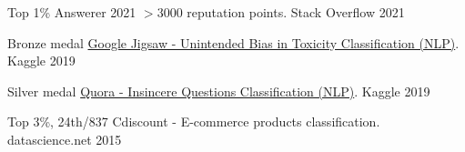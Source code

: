 
\begin{cvhonors}
  \cvhonor
    {Top 1\% Answerer 2021} %
    {$>3000$ reputation points.} %
    {Stack Overflow} %
    {2021} %

  \cvhonor
    {Bronze medal} %
    {\href{https://www.kaggle.com/competitions/jigsaw-unintended-bias-in-toxicity-classification}{Google Jigsaw - Unintended Bias in Toxicity Classification (NLP)}.} %
    {Kaggle} %
    {2019} %

  \cvhonor
    {Silver medal} %
    {\href{https://www.kaggle.com/c/quora-insincere-questions-classification}{Quora - Insincere Questions Classification (NLP)}.} %
    {Kaggle} %
    {2019} %

  \cvhonor
    {Top 3\%, 24th/837} %
    {Cdiscount - E-commerce products classification.} %
    {datascience.net} %
    {2015} %

\end{cvhonors}
